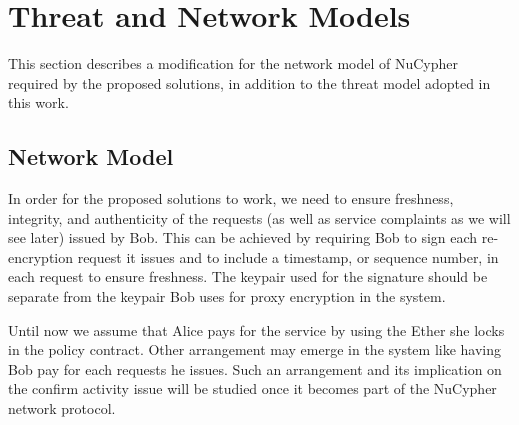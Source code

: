 \section{Threat and Network Models}
\label{threat-network-model}
This section describes a modification for the network model of NuCypher required by the proposed solutions, in 
addition to the threat model adopted in this work.


\subsection{Network Model}
In order for the proposed solutions to work, we need to ensure freshness, integrity, and authenticity of the requests (as well as service complaints as we will see later) issued by Bob. This can be achieved by requiring Bob to sign each re-encryption request it issues and to include a timestamp, or sequence number, in each request to ensure freshness. The keypair used for the signature should be separate from the keypair Bob uses for proxy encryption in the system. 


Until now we assume that Alice pays for the service by using the Ether she locks in the policy contract. Other arrangement may emerge in the system like having Bob pay for each requests he issues. Such an arrangement and its implication on the confirm activity issue will be studied once it becomes part of the NuCypher network protocol.



